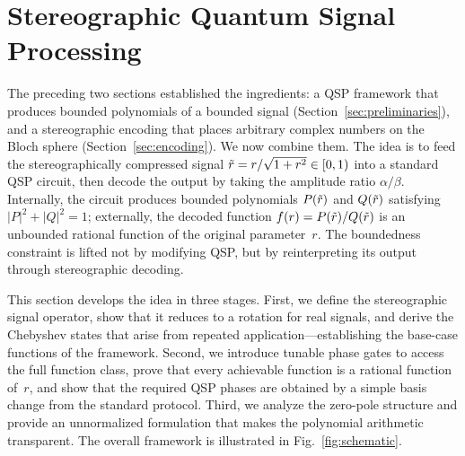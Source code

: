 \section{Stereographic Quantum Signal Processing}
\label{sec:main}

The preceding two sections established the ingredients: a QSP
framework that produces bounded polynomials of a bounded signal
(Section~\ref{sec:preliminaries}), and a stereographic encoding
that places arbitrary complex numbers on the Bloch sphere
(Section~\ref{sec:encoding}).  We now combine them.  The idea is
to feed the stereographically compressed signal
$\tilde{r} = r/\sqrt{1+r^2} \in [0,1)$ into a standard QSP
circuit, then decode the output by taking the amplitude ratio
$\alpha/\beta$.  Internally, the circuit produces bounded
polynomials $P(\tilde{r})$ and $Q(\tilde{r})$ satisfying
$|P|^2+|Q|^2=1$; externally, the decoded function
$f(r) = P(\tilde{r})/Q(\tilde{r})$ is an unbounded rational function
of the original parameter~$r$.  The boundedness constraint is
lifted not by modifying QSP, but by reinterpreting its output
through stereographic decoding.

This section develops the idea in three stages.  First, we define
the stereographic signal operator, show that it reduces to a
rotation for real signals, and derive the Chebyshev states that
arise from repeated application---establishing the base-case
functions of the framework.  Second, we introduce tunable phase
gates to access the full function class, prove that every
achievable function is a rational function of~$r$, and show
that the required QSP phases are obtained by a simple basis
change from the standard protocol.  Third, we analyze the
zero-pole structure and provide an unnormalized formulation
that makes the polynomial arithmetic transparent.  The overall
framework is illustrated in Fig.~\ref{fig:schematic}.

